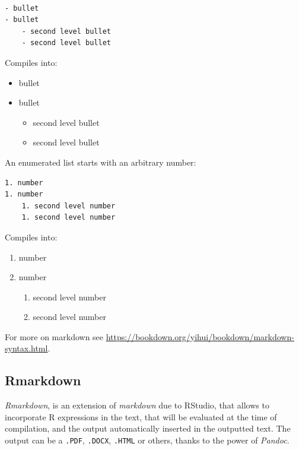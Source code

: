 \documentclass[]{book}
\providecommand{\tightlist}{%
  \setlength{\itemsep}{0pt}\setlength{\parskip}{0pt}}
\theoremstyle{definition}
\theoremstyle{definition}
\theoremstyle{definition}
\theoremstyle{remark}
\begin{document}
\begin{verbatim}

- bullet
- bullet
    - second level bullet
    - second level bullet
\end{verbatim}

Compiles into:

\begin{itemize}
\tightlist
\item
  bullet
\item
  bullet

  \begin{itemize}
  \tightlist
  \item
    second level bullet
  \item
    second level bullet
  \end{itemize}
\end{itemize}

An enumerated list starts with an arbitrary number:

\begin{verbatim}
1. number
1. number
    1. second level number
    1. second level number
\end{verbatim}

Compiles into:

\begin{enumerate}
\def\labelenumi{\arabic{enumi}.}
\tightlist
\item
  number
\item
  number

  \begin{enumerate}
  \def\labelenumii{\arabic{enumii}.}
  \tightlist
  \item
    second level number
  \item
    second level number
  \end{enumerate}
\end{enumerate}

For more on markdown see \url{https://bookdown.org/yihui/bookdown/markdown-syntax.html}.

\hypertarget{rmarkdown}{%
\subsection{Rmarkdown}\label{rmarkdown}}

\emph{Rmarkdown}, is an extension of \emph{markdown} due to RStudio, that allows to incorporate R expressions in the text, that will be evaluated at the time of compilation, and the output automatically inserted in the outputted text.
The output can be a \texttt{.PDF}, \texttt{.DOCX}, \texttt{.HTML} or others, thanks to the power of \emph{Pandoc}.
\end{document}
